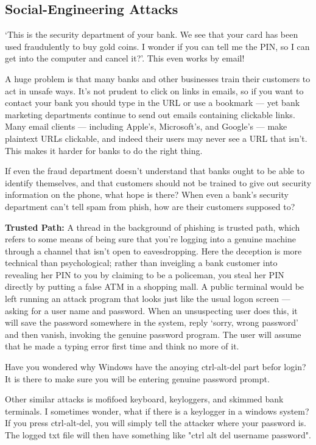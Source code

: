 \subsection{Social-Engineering Attacks}

	‘This is the security department of your bank. We see that your card
	has been used fraudulently to buy gold coins. I wonder if you can tell me the
	PIN, so I can get into the computer and cancel it?’. This even works by email!

	A huge problem is that many banks and other businesses train their customers to act in
	unsafe ways. It’s not prudent to click on links in emails, so if you want to
	contact your bank you should type in the URL or use a bookmark — yet bank
	marketing departments continue to send out emails containing clickable links.
	Many email clients — including Apple’s, Microsoft’s, and Google’s — make
	plaintext URLs clickable, and indeed their users may never see a URL that
	isn’t. This makes it harder for banks to do the right thing.

	If even the fraud department doesn’t understand that banks ought to be able to 
	identify themselves, and that customers should not be trained to give out 
	security information on the phone, what hope is there? When even a bank’s 
	security department can’t tell spam from phish, how are their customers supposed to?

	\clearpage
	{\bf Trusted Path:} A thread in the background of phishing is trusted path, 
	which refers to some means of being sure that you’re logging into a genuine machine
	through a channel that isn’t open to eavesdropping. Here the deception is
	more technical than psychological; rather than inveigling a bank customer into
	revealing her PIN to you by claiming to be a policeman, you steal her PIN
	directly by putting a false ATM in a shopping mall. A public
	terminal would be left running an attack program that looks just like the usual
	logon screen — asking for a user name and password. When an unsuspecting
	user does this, it will save the password somewhere in the system, reply
	‘sorry, wrong password’ and then vanish, invoking the genuine password
	program. The user will assume that he made a typing error first time and
	think no more of it. 

	Have you wondered why Windows have the anoying ctrl-alt-del part befor login?
	It is there to make sure you will be entering genuine password prompt.

	Other similar attacks is mofifoed keyboard, keyloggers, and skimmed bank terminals.
	I sometimes wonder, what if there is a keylogger in a windows system?
	If you press ctrl-alt-del, you will simply tell the attacker where your password is.
	The logged txt file will then have something like "ctrl alt del username password".

